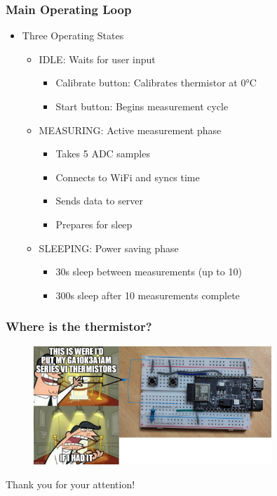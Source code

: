 \documentclass[11pt,t,usepdftitle=false,aspectratio=169]{beamer}
\begin{document}
  \begin{frame}
    \frametitle{Main Operating Loop}
      \begin{itemize}
        \item Three Operating States
        \begin{itemize}
          \item IDLE: Waits for user input
          \begin{itemize}
            \item Calibrate button: Calibrates thermistor at 0°C
            \item Start button: Begins measurement cycle
          \end{itemize}
          \item MEASURING: Active measurement phase
          \begin{itemize}
            \item Takes 5 ADC samples
            \item Connects to WiFi and syncs time
            \item Sends data to server
            \item Prepares for sleep
          \end{itemize}
          \item SLEEPING: Power saving phase
          \begin{itemize}
            \item 30s sleep between measurements (up to 10)
            \item 300s sleep after 10 measurements complete
          \end{itemize}
        \end{itemize}
      \end{itemize}
  \end{frame}

\begin{frame}
  \frametitle{Where is the thermistor?}
  \begin{figure}
    \centering
    \includegraphics[width=0.8\textwidth]{_images/9i922u.jpg}
  \end{figure}
  Thank you for your attention!
\end{frame}
\end{document}
